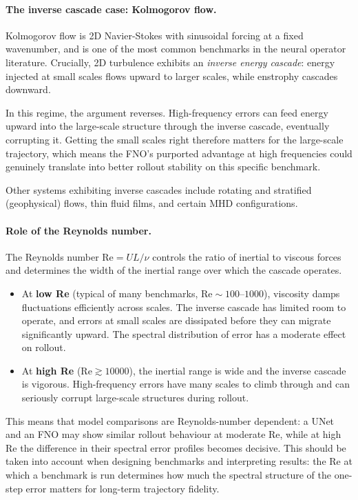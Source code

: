 \documentclass{article}
\begin{document}
\paragraph{The inverse cascade case: Kolmogorov flow.} Kolmogorov flow is 2D Navier-Stokes with sinusoidal forcing at a fixed wavenumber, and is one of the most common benchmarks in the neural operator literature. Crucially, 2D turbulence exhibits an \textit{inverse energy cascade}: energy injected at small scales flows upward to larger scales, while enstrophy cascades downward.

In this regime, the argument reverses. High-frequency errors can feed energy upward into the large-scale structure through the inverse cascade, eventually corrupting it. Getting the small scales right therefore matters for the large-scale trajectory, which means the FNO's purported advantage at high frequencies could genuinely translate into better rollout stability on this specific benchmark.

Other systems exhibiting inverse cascades include rotating and stratified (geophysical) flows, thin fluid films, and certain MHD configurations.

\paragraph{Role of the Reynolds number.} The Reynolds number $\text{Re} = UL/\nu$ controls the ratio of inertial to viscous forces and determines the width of the inertial range over which the cascade operates.
\begin{itemize}
    \item At \textbf{low Re} (typical of many benchmarks, $\text{Re} \sim 100$--$1000$), viscosity damps fluctuations efficiently across scales. The inverse cascade has limited room to operate, and errors at small scales are dissipated before they can migrate significantly upward. The spectral distribution of error has a moderate effect on rollout.
    \item At \textbf{high Re} ($\text{Re} \gtrsim 10000$), the inertial range is wide and the inverse cascade is vigorous. High-frequency errors have many scales to climb through and can seriously corrupt large-scale structures during rollout.
\end{itemize}

This means that model comparisons are Reynolds-number dependent: a UNet and an FNO may show similar rollout behaviour at moderate Re, while at high Re the difference in their spectral error profiles becomes decisive. This should be taken into account when designing benchmarks and interpreting results: the Re at which a benchmark is run determines how much the spectral structure of the one-step error matters for long-term trajectory fidelity.
\end{document}
